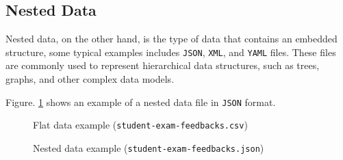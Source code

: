 \subsection{Nested Data}

Nested data, on the other hand, is the type of data that contains an embedded structure, some typical examples includes \texttt{JSON}, \texttt{XML}, and \texttt{YAML} files\cite{json_org}. These files are commonly used to represent hierarchical data structures, such as trees, graphs, and other complex data models.

Figure. \ref{fig:nested_data_file} shows an example of a nested data file in \texttt{JSON} format. 

\begin{center}
\begin{figure}[ht]
\centering
\begin{minipage}[t]{0.44\textwidth}
\centering
\setlength{\fboxsep}{4pt}
\caption{\centering Flat data example \newline (\texttt{student-exam-feedbacks.csv})}
\label{fig:flat_data_file}
\end{minipage}
\hfill
\begin{minipage}[t]{0.52\textwidth}
\centering
\setlength{\fboxsep}{4pt}
\caption{\centering Nested data example \newline (\texttt{student-exam-feedbacks.json})}
\label{fig:nested_data_file}
\end{minipage}
\end{figure}
\end{center}


